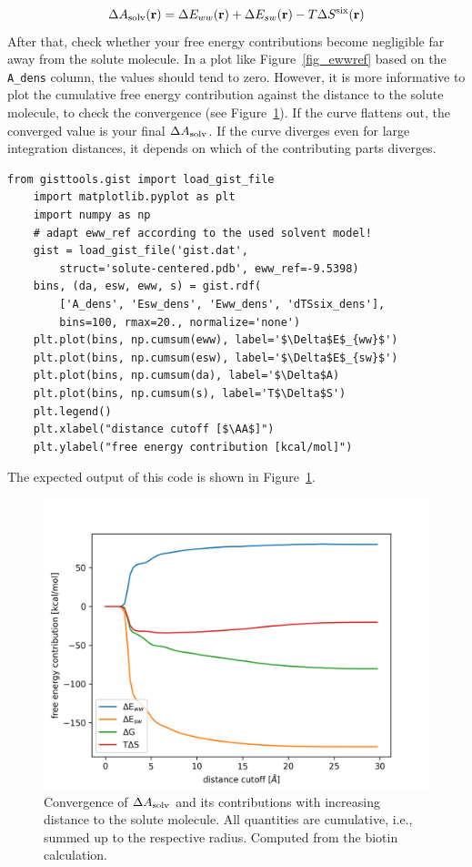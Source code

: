 \documentclass[9pt,tutorial]{livecoms}
\newcommand{\dasolv}{\Delta A_\textup{solv}}
\newcommand{\software}{\texttt}
\newcommand\inlinecode{\texttt}
\begin{document}
\newcommand{\coordinate}{\mathbf{r}}
\begin{equation}
	\dasolv(\coordinate) = \Delta E_{ww}(\coordinate) + \Delta E_{sw}(\coordinate) - T\Delta S^\text{six}(\coordinate)
\end{equation}
After that, check whether your free energy contributions become negligible far away from the solute molecule.
In a plot like Figure~\ref{fig_ewwref} based on the \inlinecode{A\_dens} column, the values should tend to zero.
However, it is more informative to plot the cumulative free energy contribution against the distance to the solute molecule, to check the convergence (see Figure~\ref{fig_radial_convergence}).
If the curve flattens out, the converged value is your final $\dasolv$\@.
If the curve diverges even for large integration distances, it depends on which of the contributing parts diverges. 
\begin{lstlisting}[style=python]
	from gisttools.gist import load_gist_file
	import matplotlib.pyplot as plt
	import numpy as np
	# adapt eww_ref according to the used solvent model! 
	gist = load_gist_file('gist.dat',
		struct='solute-centered.pdb', eww_ref=-9.5398)
	bins, (da, esw, eww, s) = gist.rdf(
		['A_dens', 'Esw_dens', 'Eww_dens', 'dTSsix_dens'],
		bins=100, rmax=20., normalize='none')
	plt.plot(bins, np.cumsum(eww), label='$\Delta$E$_{ww}$')
	plt.plot(bins, np.cumsum(esw), label='$\Delta$E$_{sw}$')
	plt.plot(bins, np.cumsum(da), label='$\Delta$A)
	plt.plot(bins, np.cumsum(s), label='T$\Delta$S')
	plt.legend()
	plt.xlabel("distance cutoff [$\AA$]")
	plt.ylabel("free energy contribution [kcal/mol]")
	\end{lstlisting}
The expected output of this code is shown in Figure~\ref{fig_radial_convergence}.
\begin{figure}
	\centering
	\includegraphics[width=0.8\linewidth]{figures/biotin-contributions_noref.png}
	\caption{Convergence of $\dasolv$ and its contributions with increasing distance to the solute molecule. All quantities are cumulative, i.e., summed up to the respective radius. Computed from the biotin calculation.}\label{fig_radial_convergence}
\end{figure}
\end{document}
